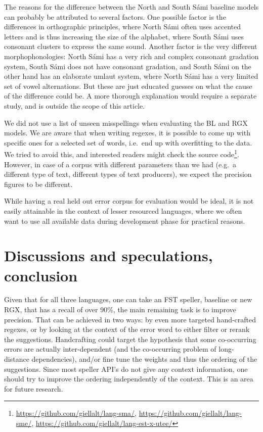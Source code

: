 \documentclass{flammie}
\begin{document}
The reasons for the difference between the North and South Sámi baseline models
can probably be attributed to several factors.  One possible factor is the
differences in orthographic principles, where North Sámi often uses accented
letters and is thus increasing the size of the alphabet, where South Sámi uses
consonant clusters to express the same sound. Another factor is the very
different morphophonologies: North Sámi has a very rich and complex consonant
gradation system, South Sámi does not have consonant gradation, and South Sámi
on the other hand has an elaborate umlaut system, where North Sámi has a very
limited set of vowel alternations. But these are just educated guesses on what
the cause of the difference could be. A more thorough explanation would require
a separate study, and is outside the scope of this article.

We did not use a list of unseen misspellings when evaluating the BL and RGX
models. We are aware that when writing regexes, it is possible to come up with
specific ones for a selected set of words, i.e.\ end up with overfitting to the
data. We tried to avoid this, and interested readers might check the source
code\footnote{\url{https://github.com/giellalt/lang-sma/},
\url{https://github.com/giellalt/lang-sme/},
\url{https://github.com/giellalt/lang-est-x-utee/}}. However, in case of a
corpus with different parameters than we had (e.g.\ a different type of text,
different types of text producers), we expect the precision figures to be
different.

While having a real held out error corpus for evaluation would be ideal, it is
not easily attainable in the context of lesser resourced languages, where we
often want to use all available data during development phase for practical
reasons.

\section{Discussions and speculations, conclusion}

Given that for all three languages, one can take an FST speller, baseline or new
RGX, that has a recall of over 90\%, the main remaining task is to improve
precision. That can be achieved in two ways: by even more targeted hand-crafted
regexes, or by looking at the context of the error word to either filter or
rerank the suggestions. Handcrafting could target the hypothesis that some
co-occurring errors are actually inter-dependent (and the co-occurring problem
of long-distance dependencies), and/or fine tune the weights and thus the
ordering of the suggestions.  Since most speller API's do not give any context
information, one should try to improve the ordering independently of the
context. This is an area for future research.
\end{document}
